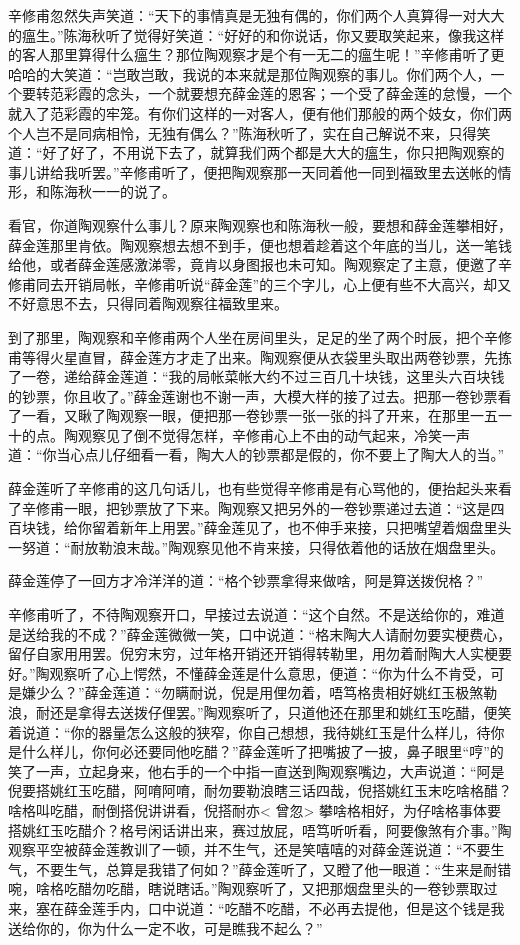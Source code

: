 \documentclass[12pt,UTF8]{ctexbook}
\begin{document}
{{{辛修甫忽然失声笑道：“天下的事情真是无独有偶的，你们两个人真算得一对大大的瘟生。”陈海秋听了觉得好笑道：“好好的和你说话，你又要取笑起来，像我这样的客人那里算得什么瘟生？那位陶观察才是个有一无二的瘟生呢！”辛修甫听了更哈哈的大笑道：“岂敢岂敢，我说的本来就是那位陶观察的事儿。你们两个人，一个要转范彩霞的念头，一个就要想充薛金莲的恩客；一个受了薛金莲的怠慢，一个就入了范彩霞的牢笼。有你们这样的一对客人，便有他们那般的两个妓女，你们两个人岂不是同病相怜，无独有偶么？”陈海秋听了，实在自己解说不来，只得笑道：“好了好了，不用说下去了，就算我们两个都是大大的瘟生，你只把陶观察的事儿讲给我听罢。”辛修甫听了，便把陶观察那一天同着他一同到福致里去送帐的情形，和陈海秋一一的说了。

看官，你道陶观察什么事儿？原来陶观察也和陈海秋一般，要想和薛金莲攀相好，薛金莲那里肯依。陶观察想去想不到手，便也想着趁着这个年底的当儿，送一笔钱给他，或者薛金莲感激涕零，竟肯以身图报也未可知。陶观察定了主意，便邀了辛修甫同去开销局帐，辛修甫听说“薛金莲”的三个字儿，心上便有些不大高兴，却又不好意思不去，只得同着陶观察往福致里来。

到了那里，陶观察和辛修甫两个人坐在房间里头，足足的坐了两个时辰，把个辛修甫等得火星直冒，薛金莲方才走了出来。陶观察便从衣袋里头取出两卷钞票，先拣了一卷，递给薛金莲道：“我的局帐菜帐大约不过三百几十块钱，这里头六百块钱的钞票，你且收了。”薛金莲谢也不谢一声，大模大样的接了过去。把那一卷钞票看了一看，又瞅了陶观察一眼，便把那一卷钞票一张一张的抖了开来，在那里一五一十的点。陶观察见了倒不觉得怎样，辛修甫心上不由的动气起来，冷笑一声道：“你当心点儿仔细看一看，陶大人的钞票都是假的，你不要上了陶大人的当。”

薛金莲听了辛修甫的这几句话儿，也有些觉得辛修甫是有心骂他的，便抬起头来看了辛修甫一眼，把钞票放了下来。陶观察又把另外的一卷钞票递过去道：“这是四百块钱，给你留着新年上用罢。”薛金莲见了，也不伸手来接，只把嘴望着烟盘里头一努道：“耐放勒浪末哉。”陶观察见他不肯来接，只得依着他的话放在烟盘里头。

薛金莲停了一回方才冷洋洋的道：“格个钞票拿得来做啥，阿是算送拨倪格？”

辛修甫听了，不待陶观察开口，早接过去说道：“这个自然。不是送给你的，难道是送给我的不成？”薛金莲微微一笑，口中说道：“格末陶大人请耐勿要实梗费心，留仔自家用用罢。倪穷末穷，过年格开销还开销得转勒里，用勿着耐陶大人实梗要好。”陶观察听了心上愕然，不懂薛金莲是什么意思，便道：“你为什么不肯受，可是嫌少么？”薛金莲道：“勿瞒耐说，倪是用俚勿着，唔笃格贵相好姚红玉极煞勒浪，耐还是拿得去送拨仔俚罢。”陶观察听了，只道他还在那里和姚红玉吃醋，便笑着说道：“你的器量怎么这般的狭窄，你自己想想，我待姚红玉是什么样儿，待你是什么样儿，你何必还要同他吃醋？”薛金莲听了把嘴披了一披，鼻子眼里“哼”的笑了一声，立起身来，他右手的一个中指一直送到陶观察嘴边，大声说道：“阿是倪要搭姚红玉吃醋，阿唷阿唷，耐勿要勒浪瞎三话四哉，倪搭姚红玉末吃啥格醋？啥格叫吃醋，耐倒搭倪讲讲看，倪搭耐亦< 曾忽> 攀啥格相好，为仔啥格事体要搭姚红玉吃醋介？格号闲话讲出来，赛过放屁，唔笃听听看，阿要像煞有介事。”陶观察平空被薛金莲教训了一顿，并不生气，还是笑嘻嘻的对薛金莲说道：“不要生气，不要生气，总算是我错了何如？”薛金莲听了，又瞪了他一眼道：“生来是耐错啘，啥格吃醋勿吃醋，瞎说瞎话。”陶观察听了，又把那烟盘里头的一卷钞票取过来，塞在薛金莲手内，口中说道：“吃醋不吃醋，不必再去提他，但是这个钱是我送给你的，你为什么一定不收，可是瞧我不起么？”

}}}
\end{document}
